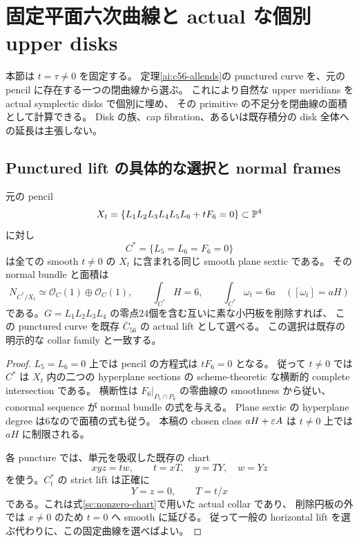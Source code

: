 \section{固定平面六次曲線と actual な個別 upper disks}
\label{ad:section}

本節は $t=\tau\ne0$ を固定する。
定理\ref{ai:c56-allends}の punctured curve を、元の pencil に存在する一つの閉曲線から選ぶ。
これにより自然な upper meridians を actual symplectic disks で個別に埋め、
その primitive の不足分を閉曲線の面積として計算できる。
Disk の族、cap fibration、あるいは既存積分の disk 全体への延長は主張しない。

\subsection{Punctured lift の具体的な選択と normal frames}

\begin{proposition}\label{ad:fixed-curve}
元の pencil
\[
 X_t=\left\{L_1L_2L_3L_4L_5L_6+tF_6=0\right\}\subset\mathbb P^4
\]
に対し
\[
 C^*=\{L_5=L_6=F_6=0\}
\]
は全ての smooth $t\ne0$ の $X_t$ に含まれる同じ smooth plane sextic である。
その normal bundle と面積は
\begin{equation}\label{ad:normal-area}
 N_{C^*/X_t}\simeq\mathcal O_C(1)\oplus\mathcal O_C(1),
 \qquad \int_{C^*}H=6,\qquad \int_{C^*}\omega_t=6a
 \quad([\omega_t]=aH)
\end{equation}
である。$G=L_1L_2L_3L_4$ の零点24個を含む互いに素な小円板を削除すれば、
この punctured curve を既存 $\bar C_{56}$ の actual lift として選べる。
この選択は既存の明示的な collar family と一致する。
\end{proposition}

\begin{proof}
$L_5=L_6=0$ 上では pencil の方程式は $tF_6=0$ となる。
従って $t\ne0$ では $C^*$ は $X_t$ 内の二つの hyperplane sections の
scheme-theoretic な横断的 complete intersection である。
横断性は $F_6|_{P_5\cap P_6}$ の零曲線の smoothness から従い、
conormal sequence が normal bundle の式を与える。
Plane sextic の hyperplane degree は6なので面積の式も従う。
本稿の chosen class $aH+\varepsilon A$ は $t\ne0$ 上では $aH$ に制限される。

各 puncture では、単元を吸収した既存の chart
\[
 xyz=tw,\qquad t=xT,\quad y=TY,\quad w=Yz
\]
を使う。$C^*_t$ の strict lift は正確に
\[
 Y=z=0,\qquad T=t/x
\]
である。これは式\eqref{sc:nonzero-chart}で用いた actual collar であり、
削除円板の外では $x\ne0$ のため $t=0$ へ smooth に延びる。
従って一般の horizontal lift を選ぶ代わりに、この固定曲線を選べばよい。
\end{proof}


